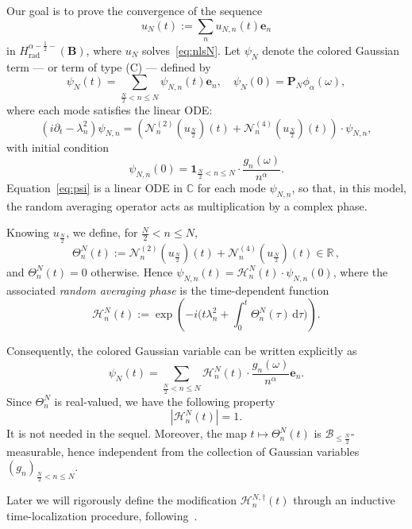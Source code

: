 \documentclass[11pt,reqno,english]{amsart}
\numberwithin{equation}{section}
\theoremstyle{plain}
\theoremstyle{definition}
\theoremstyle{remark}
\newcommand{\R}{\mathbb{R}}
\begin{document}
Our goal is to prove the convergence of the sequence
\[
u_N(t) := \sum_{n} u_{N,n}(t) \mathbf{e}_n
\]
in $H_\mathrm{rad}^{\alpha-\frac{1}{2}-}(\mathbf{B})$,
where $u_N$ solves~\eqref{eq:nlsN}. Let $\psi_N$ denote the colored Gaussian term --- or term of type (C) --- defined by
\[
\psi_N(t)
= \sum_{\frac{N}{2} < n \leq N} \psi_{N,n}(t) \mathbf{e}_n,
\quad \psi_N(0) = \mathbf{P}_N \phi_\alpha(\omega),
\]
where each mode satisfies the linear ODE:
\begin{equation}
	\label{eq:psi}
	(i\partial_t - \lambda_n^2) \psi_{N,n}
	= \left( \mathcal{N}_n^{(2)}(u_{\frac{N}{2}})(t) + \mathcal{N}_n^{(4)}(u_{\frac{N}{2}})(t) \right)\cdot \psi_{N,n},
\end{equation}
with initial condition
\[
\psi_{N,n}(0) = \mathbf{1}_{\frac{N}{2} < n \leq N} \cdot \frac{g_n(\omega)}{n^\alpha}.
\]
Equation~\eqref{eq:psi} is a linear ODE in $\mathbb{C}$ for each mode $\psi_{N,n}$, so that, in this model, the random averaging operator acts as multiplication by a complex phase.

Knowing $u_{\frac{N}{2}}$, we define, for $\frac{N}{2}<n\leq N$,
\[
\Theta_n^N(t) := \mathcal{N}_{n}^{(2)}(u_{\frac{N}{2}})(t) + \mathcal{N}_{n}^{(4)}(u_{\frac{N}{2}})(t) \in\R\,,
\]
and $\Theta_{n}^N(t)=0$ otherwise.
Hence $\psi_{N,n}(t)=\mathcal{H}_n^N(t)\cdot \psi_{N,n}(0)$, where the associated \emph{random averaging phase} is the time-dependent function
\[
\mathcal{H}_n^N(t) :=
\exp\left( -i \Big(t\lambda_{n}^{2}+\int_0^t \Theta_n^N(\tau) \, \mathrm{d}\tau\Big) \right).
\]

Consequently, the colored Gaussian variable can be written explicitly as
\begin{equation}
	\label{eq:C}
	\psi_N(t) = \sum_{\frac{N}{2} < n \leq N} \mathcal{H}_n^N(t) \cdot \frac{g_n(\omega)}{n^\alpha} \mathbf{e}_n.
\end{equation}
Since $\Theta_n^N$ is real-valued, we have the following property 
\[
	|\mathcal{H}_n^N(t)| = 1.
\]
It is not needed in the sequel. Moreover, the map $t \mapsto \Theta_n^N(t)$ is $\mathcal{B}_{\leq \frac{N}{2}}$-measurable, hence independent from the collection of Gaussian variables $(g_{n})_{\frac{N}{2}<n\leq N}$. 

Later we will rigorously define the modification $\mathcal{H}_n^{N,\dag}(t)$ through an inductive time-localization procedure, following~\cite{BCST24}.

\medskip
\end{document}
